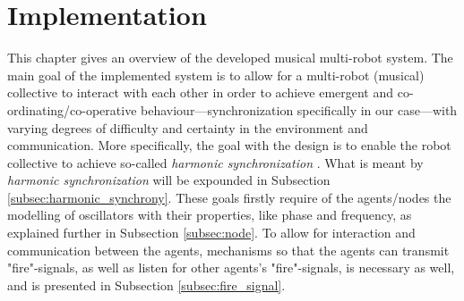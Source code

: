\chapter{Implementation}
This chapter gives an overview of the developed musical multi-robot system. The main goal of the implemented system is to allow for a multi-robot (musical) collective to interact with each other in order to achieve emergent and co-ordinating/co-operative behaviour—synchronization specifically in our case—with varying degrees of difficulty and certainty in the environment and communication. More specifically, the goal with the design is to enable the robot collective to achieve so-called \textit{harmonic synchronization} . What is meant by \textit{harmonic synchronization} will be expounded in Subsection \ref{subsec:harmonic_synchrony}. These goals firstly require of the agents/nodes the modelling of oscillators with their properties, like phase and frequency, as explained further in Subsection \ref{subsec:node}. To allow for interaction and communication between the agents, mechanisms so that the agents can transmit "fire"-signals, as well as listen for other agents's "fire"-signals, is necessary as well, and is presented in Subsection \ref{subsec:fire_signal}.









